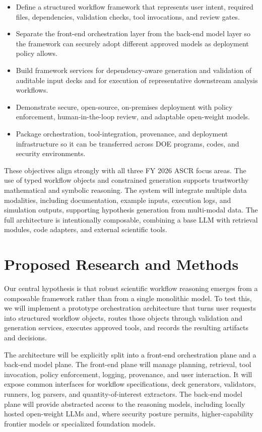 \documentclass[11pt]{article} \usepackage[margin=1in]{geometry}
\begin{document}
\begin{itemize} \item Define a structured workflow framework that represents
user intent, required files, dependencies, validation checks, tool invocations,
and review gates.  \item Separate the front-end orchestration layer from the
back-end model layer so the framework can securely adopt different approved
models as deployment policy allows.  \item Build framework services for
dependency-aware generation and validation of auditable input decks and for
execution of representative downstream analysis workflows.  \item Demonstrate
secure, open-source, on-premises deployment with policy enforcement,
human-in-the-loop review, and adaptable open-weight models.  \item Package
orchestration, tool-integration, provenance, and deployment infrastructure so it
can be transferred across DOE programs, codes, and security environments.
\end{itemize}

These objectives align strongly with all three FY 2026 ASCR focus areas. The use
of typed workflow objects and constrained generation supports trustworthy
mathematical and symbolic reasoning. The system will integrate multiple data
modalities, including documentation, example inputs, execution logs, and
simulation outputs, supporting hypothesis generation from multi-modal data. The
full architecture is intentionally composable, combining a base LLM with
retrieval modules, code adapters, and external scientific tools.

\section{Proposed Research and Methods} Our central hypothesis is that robust
scientific workflow reasoning emerges from a composable framework rather than
from a single monolithic model. To test this, we will implement a prototype
orchestration architecture that turns user requests into structured workflow
objects, routes those objects through validation and generation services,
executes approved tools, and records the resulting artifacts and decisions.

The architecture will be explicitly split into a front-end orchestration plane
and a back-end model plane. The front-end plane will manage planning, retrieval,
tool invocation, policy enforcement, logging, provenance, and user interaction.
It will expose common interfaces for workflow specifications, deck generators,
validators, runners, log parsers, and quantity-of-interest extractors. The
back-end model plane will provide abstracted access to the reasoning models,
including locally hosted open-weight LLMs and, where security posture permits,
higher-capability frontier models or specialized foundation models.
\end{document}
